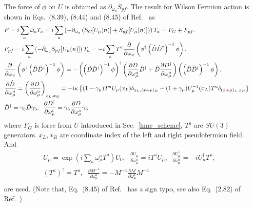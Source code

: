 The force of $\phi$ on $U$ is obtained as $\partial _{\omega_a}S_{pf}$. The result for Wilson Fermion action is shown in Eqs.~(8.39), (8.44) and (8.45) of Ref.~\cite{latticeqcdbook2010} as
\begin{equation}
\begin{split}
&F=i\sum _a\dot{\omega}_aT_a=i\sum _a\left(-\partial _{\omega _a}\left(S_G[U_{\mu}(n)]+S_{pf}[U_{\mu}(n)]\right)\right)T_a=F_G+F_{pf}.\\
&F_{pf}=i\sum _a\left(-\partial _{\omega _a}S_{pf}[U_{\mu}(n)]\right)T_a=-i\sum_aT^a \frac{\partial}{\partial \omega_a} \left(\phi ^{\dagger}\left(\hat{D}\hat{D}^{\dagger}\right)^{-1}\phi\right).\\
&\frac{\partial}{\partial \omega_a} \left(\phi ^{\dagger}\left(\hat{D}\hat{D}^{\dagger}\right)^{-1}\phi\right) = -\left(\left(\hat{D}\hat{D}^{\dagger}\right)^{-1}\phi\right)^{\dagger}\left(\frac{\partial D}{\partial \omega _{\mu}^a}\hat{D}^{\dagger}+\hat{D}\frac{\partial D^{\dagger}}{\partial \omega _{\mu}^a}\right)\left(\left(\hat{D}\hat{D}^{\dagger}\right)^{-1}\phi\right).\\
&\frac{\partial \hat{D}}{\partial {\omega _{\mu}^a}}=\left(\frac{\partial D}{\partial {\omega _{\mu}^a}}\right)_{x_L.x_R}=-i\kappa \left\{(1-\gamma _{\mu})T^aU_{\mu}(x_L)\delta _{x_L,(x+\mu)_R}-(1+\gamma _{\mu})U_{\mu}^{-1}(x_L)T^a\delta _{(x\textcolor[rgb]{1,0,0}{+}\mu)_L,x_R} \right\} \\
&\hat{D}^{\dagger} = \gamma _5 \hat{D} \gamma _5, \;\;\frac{\partial D^{\dagger}}{\partial \omega _{\mu}^i}=\gamma _5 \frac{\partial D}{\partial \omega _{\mu}^a} \gamma _5\\
\end{split}
\end{equation}
where $F_G$ is force from $U$ introduced in Sec.~\ref{hmc_scheme}, $T^a$ are $SU(3)$ generators. $x_L,x_R$ are coordinate index of the left and right pseudofermion field. And
\begin{equation}
\begin{split}
&U_{\mu}=\exp (i\sum _a \omega _{\mu}^a T^a)U_0,\;\;\frac{\partial U_{\mu}}{\partial \omega_{\mu}^a}=iT^aU_{\mu},\;\;\frac{\partial U^{\dagger}_{\mu}}{\partial \omega_{\mu}^a}=-iU^{\dagger}_{\mu}T^a,\\
&\left(T^a\right)^{\dagger}=T^a,\;\;\frac{\partial M^{-1}}{\partial \omega _{\mu}^a}=-M^{-1}\frac{\partial M}{\partial \omega _{\mu}^a}M^{-1}\\
\end{split}
\end{equation}
are used. (Note that, Eq.~(8.45) of Ref.~\cite{latticeqcdbook2010} has a sign typo, see also Eq.~(2.82) of Ref.~\cite{latticeqcdreview2009})

